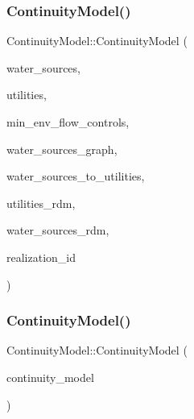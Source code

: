 \subsubsection{\texorpdfstring{Continuity\+Model()}{ContinuityModel()}\hspace{0.1cm}{\footnotesize\ttfamily [1/2]}}
{\footnotesize\ttfamily Continuity\+Model\+::\+Continuity\+Model (\begin{DoxyParamCaption}\item[{vector$<$ \mbox{\hyperlink{classWaterSource}{Water\+Source}} $\ast$$>$ \&}]{water\+\_\+sources,  }\item[{vector$<$ \mbox{\hyperlink{classUtility}{Utility}} $\ast$$>$ \&}]{utilities,  }\item[{vector$<$ \mbox{\hyperlink{classMinEnvFlowControl}{Min\+Env\+Flow\+Control}} $\ast$$>$ \&}]{min\+\_\+env\+\_\+flow\+\_\+controls,  }\item[{const \mbox{\hyperlink{classGraph}{Graph}} \&}]{water\+\_\+sources\+\_\+graph,  }\item[{const vector$<$ vector$<$ int $>$$>$ \&}]{water\+\_\+sources\+\_\+to\+\_\+utilities,  }\item[{vector$<$ double $>$ \&}]{utilities\+\_\+rdm,  }\item[{vector$<$ double $>$ \&}]{water\+\_\+sources\+\_\+rdm,  }\item[{unsigned long}]{realization\+\_\+id }\end{DoxyParamCaption})}

\mbox{\label{classContinuityModel_a7f46eb1f937b813226ca7fee96e5fd5c}} 
\subsubsection{\texorpdfstring{Continuity\+Model()}{ContinuityModel()}\hspace{0.1cm}{\footnotesize\ttfamily [2/2]}}
{\footnotesize\ttfamily Continuity\+Model\+::\+Continuity\+Model (\begin{DoxyParamCaption}\item[{\mbox{\hyperlink{classContinuityModel}{Continuity\+Model}} \&}]{continuity\+\_\+model }\end{DoxyParamCaption})}

\mbox{\label{classContinuityModel_a6644d91cc76b2ccc57103aa1a2ab0c03}} 
